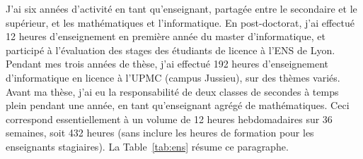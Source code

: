 \documentclass[11pt]{article}
\begin{document}
J'ai six années d'activité en tant qu'enseignant, partagée entre le secondaire et le supérieur, et les mathématiques et l'informatique. En post-doctorat, j'ai effectué 12 heures d'enseignement en première année du master d'informatique, et participé à l'évaluation des stages des étudiants de licence à l'ENS de Lyon. Pendant mes trois années de thèse, j'ai effectué 192 heures d'enseignement d'informatique en licence à l'UPMC (campus Jussieu), sur des thèmes variés. Avant ma thèse, j'ai eu la responsabilité de deux classes de secondes à temps plein pendant une année, en tant qu'enseignant agrégé de mathématiques. Ceci correspond essentiellement à un volume de 12 heures hebdomadaires sur 36 semaines, soit 432 heures (sans inclure les heures de formation pour les enseignants stagiaires).
La Table~\ref{tab:ens} résume ce paragraphe.
\end{document}
